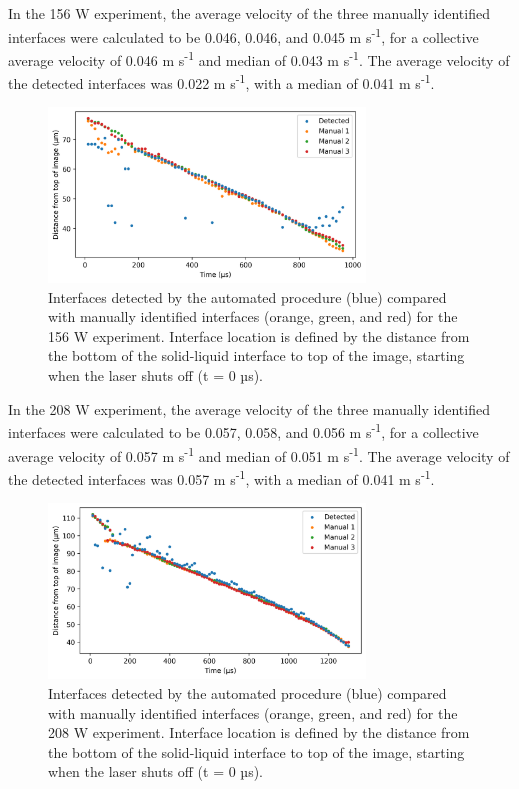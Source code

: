 In the 156 W experiment, the average velocity of the three
manually identified interfaces were calculated to be 0.046, 0.046, and 0.045
m s\textsuperscript{-1}, for a collective average velocity of 0.046
m s\textsuperscript{-1} and median of 0.043 m s\textsuperscript{-1}. The
average velocity of the detected interfaces was 0.022 m s\textsuperscript{-1},
with a median of 0.041 m s\textsuperscript{-1}.

\begin{figure}[ht]
    \centering
    \includegraphics[width=0.75\textwidth]{figures/04/13-detected-vs-manual-2-06_shot01.png}
    \caption{
        \small{}
        Interfaces detected by the automated procedure (blue) compared with
        manually identified interfaces (orange, green, and red) for the
        156 W experiment. Interface location is defined by the distance from
        the bottom of the solid-liquid interface to top of the image,
        starting when the laser shuts off (t = 0 µs).
    }
    \label{fig/detected-aps-2}
\end{figure}

In the 208 W experiment, the average velocity of the three
manually identified interfaces were calculated to be 0.057, 0.058, and 0.056
m s\textsuperscript{-1}, for a collective average velocity of 0.057
m s\textsuperscript{-1} and median of 0.051 m s\textsuperscript{-1}.
The average velocity of
the detected interfaces was 0.057 m s\textsuperscript{-1}, with a median
of 0.041 m s\textsuperscript{-1}.

\begin{figure}[ht]
    \centering
    \includegraphics[width=0.75\textwidth]{figures/04/14-detected-vs-manual-3-12_shot01.png}
    \caption{
        \small{}
        Interfaces detected by the automated procedure (blue) compared with
        manually identified interfaces (orange, green, and red) for the
        208 W experiment. Interface location is defined by the distance from
        the bottom of the solid-liquid interface to top of the image,
        starting when the laser shuts off (t = 0 µs).
    }
    \label{fig/detected-aps-3}
\end{figure}


